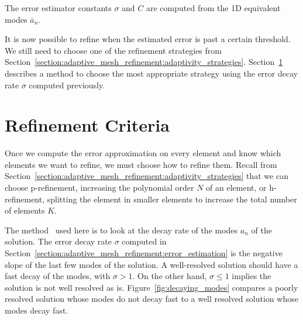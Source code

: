 \noindent
The error estimator constants \(\sigma \) and \(C\) are computed from the 1D equivalent modes
\(\overline{a}_n\).

It is now possible to refine when the estimated error is past a certain threshold. We still need to
choose one of the refinement strategies from
Section~\ref{section:adaptive_mesh_refinement:adaptivity_strategies}.
Section~\ref{section:adaptive_mesh_refinement:refinement_criteria} describes a method to choose the
most appropriate strategy using the error decay rate \(\sigma \) computed previously.

\section{Refinement Criteria}\label{section:adaptive_mesh_refinement:refinement_criteria}

Once we compute the error approximation on every element and know which elements we want to refine,
we must choose how to refine them. Recall from
Section~\ref{section:adaptive_mesh_refinement:adaptivity_strategies} that we can choose
p-refinement, increasing the polynomial order \(N\) of an element, or h-refinement, splitting the
element in smaller elements to increase the total number of elements \(K\).

The method~\cite{Mavriplis1990} used here is to look at the decay rate of the modes \(a_n\) of the
solution. The error decay rate \(\sigma \) computed in
Section~\ref{section:adaptive_mesh_refinement:error_estimation} is the negative slope of the last
few modes of the solution. A well-resolved solution should have a fast decay of the modes, with
\(\sigma > 1\). On the other hand, \(\sigma \leqslant 1\) implies the solution is not well resolved
as is. Figure~\ref{fig:decaying_modes} compares a poorly resolved solution whose modes do not decay
fast to a well resolved solution whose modes decay fast.

